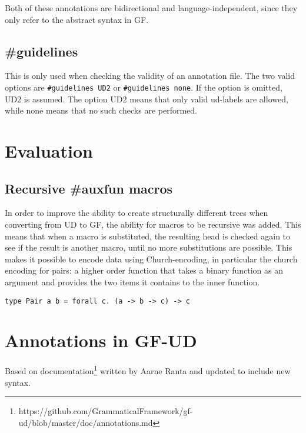 Both of these annotations are bidirectional and language-independent, since they only refer to the abstract syntax in GF.

\subsection{\#guidelines}

This is only used when checking the validity of an annotation file. The two valid options are \verb|#guidelines UD2| or \verb|#guidelines none|. If the option is omitted, UD2 is assumed. The option UD2 means that only valid ud-labels are allowed, while none means that no such checks are performed.


\section{Evaluation}

\subsection{Recursive \#auxfun macros}


In order to improve the ability to create structurally different trees when converting from UD to GF, the ability for macros to be recursive was added. This means that when a macro is substituted, the resulting head is checked again to see if the result is another macro, until no more substitutions are possible. This makes it possible to encode data using Church-encoding, in particular the church encoding for pairs: a higher order function that takes a binary function as an argument and provides the two items it contains to the inner function.

\begin{verbatim}
type Pair a b = forall c. (a -> b -> c) -> c
\end{verbatim}



\hypertarget{annotations-in-gf-ud}{%
\section{Annotations in GF-UD}\label{annotations-in-gf-ud}}

Based on documentation\footnote{https://github.com/GrammaticalFramework/gf-ud/blob/master/doc/annotations.md} written by Aarne Ranta and updated to include new syntax.

